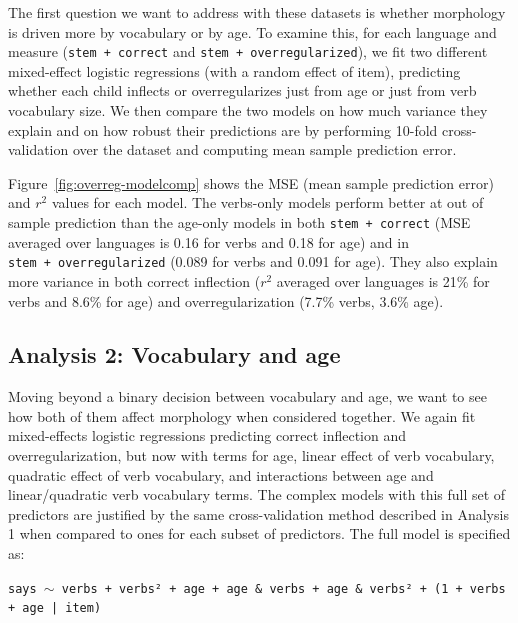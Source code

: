 \documentclass[
   11pt,
       ]{book}
\begin{document}
The first question we want to address with these datasets is whether morphology is driven more by vocabulary or by age. To examine this, for each language and measure (\texttt{stem\ +\ correct} and \texttt{stem\ +\ overregularized}), we fit two different mixed-effect logistic regressions (with a random effect of item), predicting whether each child inflects or overregularizes just from age or just from verb vocabulary size. We then compare the two models on how much variance they explain and on how robust their predictions are by performing 10-fold cross-validation over the dataset and computing mean sample prediction error.

Figure~\ref{fig:overreg-modelcomp} shows the MSE (mean sample prediction error) and \(r^2\) values for each model. The verbs-only models perform better at out of sample prediction than the age-only models in both \texttt{stem\ +\ correct} (MSE averaged over languages is 0.16 for verbs and 0.18 for age) and in \texttt{stem\ +\ overregularized} (0.089 for verbs and 0.091 for age). They also explain more variance in both correct inflection (\(r^2\) averaged over languages is 21\% for verbs and 8.6\% for age) and overregularization (7.7\% verbs, 3.6\% age).

\hypertarget{analysis-2-vocabulary-and-age}{%
\subsection{Analysis 2: Vocabulary and age}\label{analysis-2-vocabulary-and-age}}

Moving beyond a binary decision between vocabulary and age, we want to see how both of them affect morphology when considered together. We again fit mixed-effects logistic regressions predicting correct inflection and overregularization, but now with terms for age, linear effect of verb vocabulary, quadratic effect of verb vocabulary, and interactions between age and linear/quadratic verb vocabulary terms. The complex models with this full set of predictors are justified by the same cross-validation method described in Analysis 1 when compared to ones for each subset of predictors. The full model is specified as:

\begin{footnotesize}
\texttt{says $\sim$ verbs + verbs² + age + age \& verbs + age \& verbs² + (1 + verbs + age | item)}
\end{footnotesize}
\end{document}
